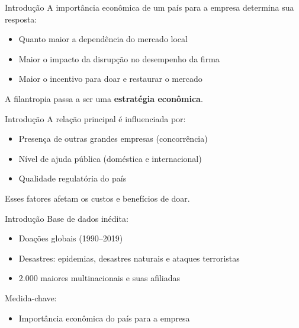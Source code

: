 \documentclass[
  10pt,
  ignorenonframetext,
  aspectratio=169,
  brazilian,
]{beamer}
\providecommand{\tightlist}{%
  \setlength{\itemsep}{0pt}\setlength{\parskip}{0pt}}
\begin{document}
\begin{frame}{Introdução}
\label{introduuxe7uxe3o-4}
A importância econômica de um país para a empresa determina sua
resposta:

\begin{itemize}
\tightlist
\item
  Quanto maior a dependência do mercado local
\item
  Maior o impacto da disrupção no desempenho da firma
\item
  Maior o incentivo para doar e restaurar o mercado
\end{itemize}

A filantropia passa a ser uma \textbf{estratégia econômica}.
\end{frame}

\begin{frame}{Introdução}
\label{introduuxe7uxe3o-5}
A relação principal é influenciada por:

\begin{itemize}
\tightlist
\item
  Presença de outras grandes empresas (concorrência)
\item
  Nível de ajuda pública (doméstica e internacional)
\item
  Qualidade regulatória do país
\end{itemize}

Esses fatores afetam os custos e benefícios de doar.
\end{frame}

\begin{frame}{Introdução}
\label{introduuxe7uxe3o-6}
Base de dados inédita:

\begin{itemize}
\tightlist
\item
  Doações globais (1990--2019)
\item
  Desastres: epidemias, desastres naturais e ataques terroristas
\item
  2.000 maiores multinacionais e suas afiliadas
\end{itemize}

Medida-chave:

\begin{itemize}
\tightlist
\item
  Importância econômica do país para a empresa
\end{itemize}
\end{frame}
\end{document}

